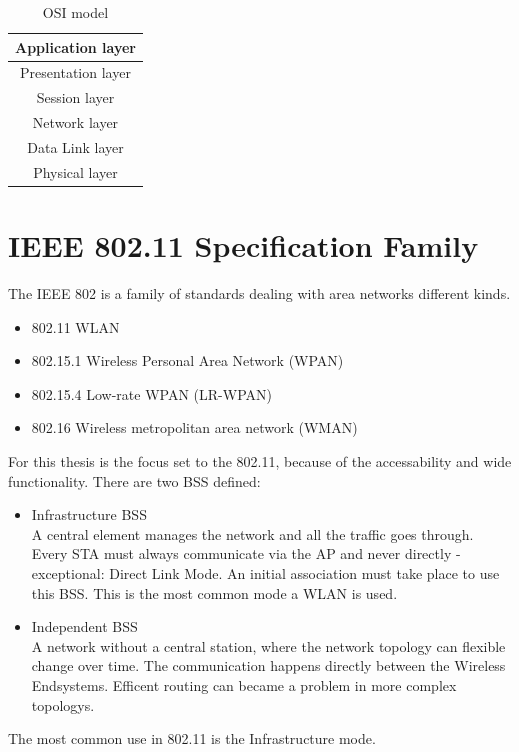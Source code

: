\documentclass[]{ccs-thesis}
\begin{document}
\begin{table}
	\centering
	\begin{tabular}{ |c| } 
		\hline
		Application layer\\
		\hline
		Presentation layer\\
		\hline
		Session layer\\
		\hline
		Network layer\\
		\hline
		\cellcolor{yellow!25}Data Link layer\\
		\hline
		\cellcolor{yellow!25}Physical layer\\
		\hline
	\end{tabular}
	\caption{\ac{OSI} model}
	\label{tab:OsiModel}
\end{table}

\section{IEEE 802.11 Specification Family}

The \ac{IEEE} 802 is a family of standards dealing with area networks different kinds.
\begin{itemize}
	\item 802.11 \ac{WLAN}
	\item 802.15.1 Wireless Personal Area Network (WPAN)
	\item 802.15.4 Low-rate WPAN (LR-WPAN)
	\item 802.16 Wireless metropolitan area network (WMAN)
\end{itemize}

For this thesis is the focus set to the 802.11, because of the accessability and wide functionality.
There are two \ac{BSS} defined:
\begin{itemize}
	\item Infrastructure BSS\\
	A central element manages the network and all the traffic goes through. 
	Every \ac{STA} must always communicate via the \ac{AP} and never directly - exceptional: Direct Link Mode.
	An initial association must take place to use this \ac{BSS}.
	This is the most common mode a \ac{WLAN} is used.
	\item Independent BSS\\
	A network without a central station, where the network topology can flexible change over time.
	The communication happens directly between the Wireless Endsystems.
	Efficent routing can became a problem in more complex topologys.
\end{itemize}
The most common use in 802.11 is the Infrastructure mode.\\ 
\end{document}
